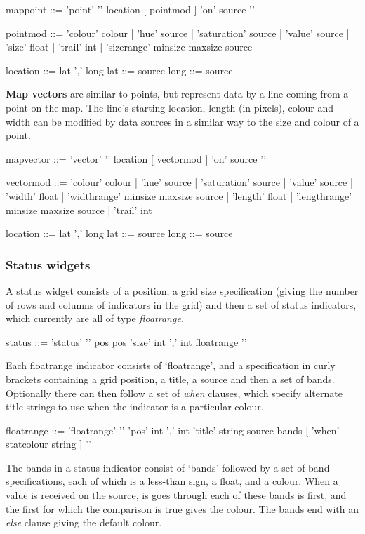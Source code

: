 \begin{v}
mappoint    ::= 'point' '{' location [{ pointmod }] 'on' source '}'

pointmod    ::= 'colour' colour
            |   'hue' source
            |   'saturation' source
            |   'value' source
            |   'size' float
            |   'trail' int
            |   'sizerange' minsize maxsize source

location    ::= lat ',' long
lat         ::= source
long        ::= source
\end{v}

\textbf{Map vectors} are similar to points, but represent data
by a line coming from a point on the map. The line's starting location,
length (in pixels), colour and width can be modified by data sources
in a similar way to the size and colour of a point.

\begin{v}
mapvector    ::= 'vector' '{' location [{ vectormod }] 'on' source '}'

vectormod    ::= 'colour' colour
            |   'hue' source
            |   'saturation' source
            |   'value' source
            |   'width' float
            |   'widthrange' minsize maxsize source
            |   'length' float
            |   'lengthrange' minsize maxsize source
            |   'trail' int

location    ::= lat ',' long
lat         ::= source
long        ::= source
\end{v}

\subsubsection{Status widgets}
A status widget consists of a position, a grid size specification
(giving the number of rows and columns of indicators in the grid)
and then a set of status indicators, which currently are all
of type \emph{floatrange.} 

\begin{v}
status      ::= 'status' '{' 
                pos
                pos 
                'size' int ',' int
                { floatrange }
               '}'
\end{v}

Each floatrange indicator consists of `floatrange', and a specification
in curly brackets containing a grid position, a title, a source
and then a set of bands. Optionally there can then follow a set
of \emph{when} clauses, which specify alternate title strings
to use when the indicator is a particular colour.
\begin{v}
floatrange  ::= 'floatrange' '{' 
                    'pos' int ',' int
                    'title' string
                    source
                    bands
                    [{ 'when' statcolour string }]
                '}'
\end{v}
The bands in a status indicator consist of `bands' followed by
a set of band specifications, each of which is a less-than sign,
a float, and a colour. When a value is received on the source,
is goes through each of these bands is first, and the first for
which the comparison is true gives the colour. The bands end
with an \emph{else} clause giving the default colour.

